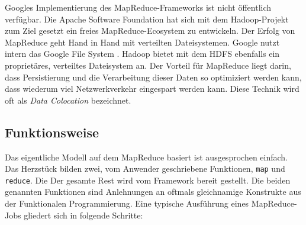 \documentclass[a4paper]{article}
\begin{document}
Googles Implementierung des MapReduce-Frameworks ist nicht öffentlich verfügbar. Die Apache Software Foundation hat sich mit dem Hadoop-Projekt zum Ziel gesetzt ein freies MapReduce-Ecosystem zu entwickeln. Der Erfolg von MapReduce geht Hand in Hand mit verteilten Dateisystemen. Google nutzt intern das Google File System \cite{GFS}. Hadoop bietet mit dem HDFS ebenfalls ein proprietäres, verteiltes Dateisystem an. Der Vorteil für MapReduce liegt darin, dass Persistierung und die Verarbeitung dieser Daten so optimiziert werden kann, dass wiederum viel Netzwerkverkehr eingespart werden kann. Diese Technik wird oft als \textit{Data Colocation} bezeichnet.

\subsection{Funktionsweise}
\label{sec:mapreduce-operation}
Das eigentliche Modell auf dem MapReduce basiert ist ausgesprochen einfach. Das Herzstück bilden zwei, vom Anwender geschriebene Funktionen, \texttt{map} und \texttt{reduce}. Die  Der gesamte Rest wird vom Framework bereit gestellt. Die beiden genannten Funktionen sind Anlehnungen an oftmals gleichnamige Konstrukte aus der Funktionalen Programmierung. Eine typische Ausführung eines MapReduce-Jobs gliedert sich in folgende Schritte:
\end{document}
